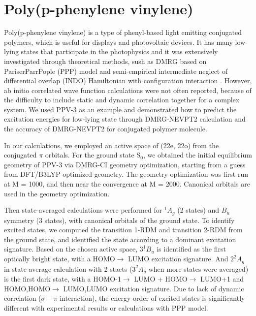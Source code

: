 \section{Poly(p-phenylene vinylene)}

Poly(p-phenylene vinylene) is a type of phenyl-based light emitting conjugated polymers, which is useful for displays and photovoltaic devices. It has many low-lying states that participate in the photophysics and it was extensively investigated through theoretical methods, sush as DMRG based on Pariser\textendash Parr\textendash Pople (PPP) model \cite{shukla_correlated_2002}\cite{bursill_symmetry-adapted_2009} and semi-empirical intermediate neglect of differential overlap (INDO) Hamiltonian with configuration interaction \cite{beljonne_theoretical_1995}. 
However, ab initio correlated wave function calculations were not often reported, because of the difficulty to include static and dynamic correlation together for a complex system.
We used PPV-3 as an example and demonstrated how to predict the excitation energies for low-lying state through DMRG-NEVPT2 calculation and the accuracy of DMRG-NEVPT2 for conjugated polymer molecule.

In our calculations, we employed an active space of (22e, 22o) from the conjugated $\pi$ orbitals. For the ground state S$_{0}$, we obtained the initial equilibrium geometry of PPV-3 via DMRG-CI geometry optimization, starting from a guess from DFT/B3LYP optimized geometry. The geometry optimization was first run at M = 1000, and then near the convergence at M = 2000. Canonical orbitals are used in the geometry optimization.

Then state-averaged calculations were performed for $^1A_g$ (2 states) and $B_u$ symmetry (3 states), with canonical orbitals of the ground state. 
To identify excited states, we computed the transition 1-RDM and transition 2-RDM from the ground state, and identified the state according to a dominant excitation signature.
Based on the chosen active space, $3^1B_u$ is identified as the first optically bright state, with a HOMO$\rightarrow$ LUMO excitation signature. And $2^2A_g$ in state-average calculation with 2 staets ($3^2A_g$ when more states were averaged) is the first dark state, with a HOMO-1$\rightarrow$ LUMO + HOMO$\rightarrow$ LUMO+1 and HOMO,HOMO$\rightarrow$ LUMO,LUMO excitation signature.
Due to lack of dynamic correlation ($\sigma-\pi$ interaction), the energy order of excited states is significantly different with experimental results or calculations with PPP model.


